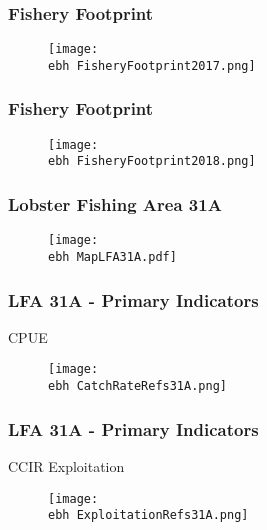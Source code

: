 \documentclass{beamer}
\newcommand{\ebh}{\string~/bio.data/bio.lobster/figures/Assessment/LFA2732/} %
\begin{document}
\begin{frame}
\frametitle{Fishery Footprint}
\begin{figure}
        \begin{center}
            \texttt{[image: \\ebh FisheryFootprint2017.png]}
        \end{center}
    \end{figure}
\end{frame}




\begin{frame}
\frametitle{Fishery Footprint}
\begin{figure}
        \begin{center}
            \texttt{[image: \\ebh FisheryFootprint2018.png]}
        \end{center}
    \end{figure}
\end{frame}







\begin{frame}
\frametitle{Lobster Fishing Area 31A}
\begin{figure}
        \begin{center}
            \texttt{[image: \\ebh MapLFA31A.pdf]}
        \end{center}
    \end{figure}
\end{frame}


\begin{frame}
\frametitle{LFA 31A - Primary Indicators}
CPUE
\begin{figure}
        \begin{center}
            \texttt{[image: \\ebh CatchRateRefs31A.png]}
        \end{center}
    \end{figure}
\end{frame}



\begin{frame}
\frametitle{LFA 31A - Primary Indicators}
CCIR Exploitation 
\begin{figure}
        \begin{center}
            \texttt{[image: \\ebh ExploitationRefs31A.png]}
        \end{center}
    \end{figure}
\end{frame}
\end{document}
